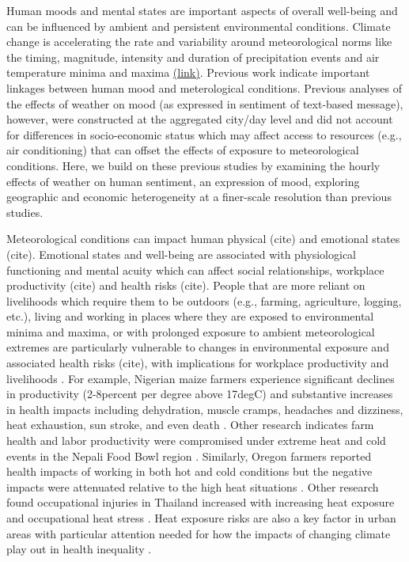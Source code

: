 \documentclass{article}
\begin{document}
Human moods and mental states are important aspects of overall well-being and can be influenced by ambient and persistent environmental conditions. Climate change is accelerating the rate and variability around meteorological norms like the timing, magnitude, intensity and duration of precipitation events and air temperature minima and maxima \href{https://www.ipcc.ch/site/assets/uploads/2018/03/SREX-Chap3_FINAL-1.pdf}{(link)}. Previous work \citep{baylis_weather_2018} indicate important linkages between human mood and meterological conditions. Previous analyses of the effects of weather on mood (as expressed in sentiment of text-based message), however, were constructed at the aggregated city/day level and did not account for differences in socio-economic status which may affect access to resources (e.g., air conditioning) that can offset the effects of exposure to meteorological conditions. Here, we build on these previous studies by examining the hourly effects of weather on human sentiment, an expression of mood, exploring geographic and economic heterogeneity at a finer-scale resolution than previous studies.  

Meteorological conditions can impact human physical (cite) and emotional states (cite). Emotional states and well-being are associated with physiological functioning and mental acuity which can affect social relationships, workplace productivity (cite) and health risks (cite). People that are more reliant on livelihoods which require them to be outdoors (e.g., farming, agriculture, logging, etc.), living and working in places where they are exposed to environmental minima and maxima, or with prolonged exposure to ambient meteorological extremes are particularly vulnerable to changes in environmental exposure \citep{frimpong_heat_2017} and associated health risks (cite), with implications for workplace productivity and livelihoods \cite{kjellstrom_impact_2016}. For example, Nigerian maize farmers experience significant declines in productivity (2-8percent per degree above 17degC) and substantive increases in health impacts including dehydration, muscle cramps, headaches and dizziness, heat exhaustion, sun stroke, and even death \cite{sadiq_impact_2019}. Other research indicates farm health and labor productivity were compromised under extreme heat and cold events in the Nepali Food Bowl region \cite{budhathoki_socio-economic_2019}. Similarly, Oregon farmers reported health impacts of working in both hot and cold conditions but the negative impacts were attenuated relative to the high heat situations \cite{bethel_heat-related_2014}. Other research found occupational injuries in Thailand increased with increasing heat exposure and occupational heat stress \cite{tawatsupa_association_2013}. Heat exposure risks are also a key factor in urban areas with particular attention needed for how the impacts of changing climate play out in health inequality \cite{friel_urban_2011}. 
\end{document}
